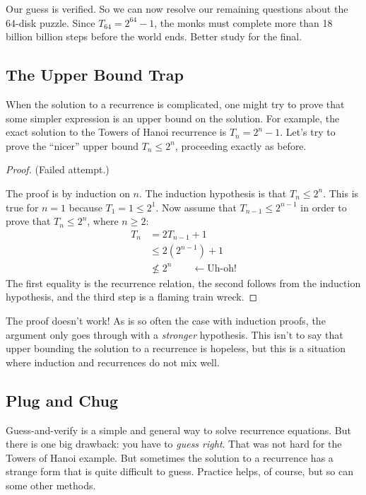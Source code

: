 Our guess is verified.  So we can now resolve our remaining questions
about the 64-disk puzzle.  Since $T_{64} = 2^{64} - 1$, the monks must
complete more than 18 billion billion steps before the world ends.
Better study for the final.

\subsection{The Upper Bound Trap}

When the solution to a recurrence is complicated, one might try to
prove that some simpler expression is an upper bound on the solution.
For example, the exact solution to the Towers of Hanoi recurrence is
$T_n = 2^n - 1$.  Let's try to prove the ``nicer'' upper bound $T_n
\leq 2^n$, proceeding exactly as before.

\begin{proof} (Failed attempt.)

  The proof is by induction on $n$.  The induction hypothesis is that
  $T_n \leq 2^n$.  This is true for $n = 1$ because $T_1 = 1 \leq 2^1$.
  Now assume that $T_{n-1} \leq 2^{n-1}$ in order to prove that $T_n
  \leq 2^n$, where $n \geq 2$:
\begin{align*}
T_n & = 2 T_{n-1} + 1 \\
  & \leq 2 (2^{n-1}) + 1 \\
  & \not\leq 2^n \qquad \leftarrow \text{Uh-oh!}
\end{align*}
The first equality is the recurrence relation, the second follows from
the induction hypothesis, and the third step is a flaming train wreck.
\end{proof}

The proof doesn't work!  As is so often the case with induction
proofs, the argument only goes through with a \emph{stronger}
hypothesis.  This isn't to say that upper bounding the solution to a
recurrence is hopeless, but this is a situation where induction and
recurrences do not mix well.

\subsection{Plug and Chug}

Guess-and-verify is a simple and general way to solve recurrence
equations.  But there is one big drawback: you have to \emph{guess
  right}.  That was not hard for the Towers of Hanoi example.  But
sometimes the solution to a recurrence has a strange form that is
quite difficult to guess.  Practice helps, of course, but so can some
other methods.

